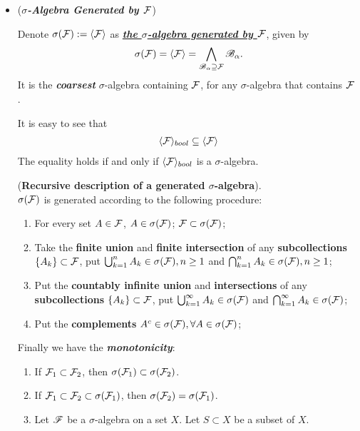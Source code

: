 \documentclass[11pt]{article}
\begin{document}
\begin{itemize}
\item  \begin{example} (\emph{\textbf{$\sigma$-Algebra Generated by ${\mathcal F}$}})
\begin{definition}
Denote $\sigma({\mathcal F}) := \langle {\mathcal F} \rangle$ as  \underline{\emph{\textbf{the $\sigma$-algebra generated by ${\mathcal F}$}}}, given by 
\begin{align*}
\sigma({\mathcal F}) = \langle {\mathcal F} \rangle = \bigwedge_{{\mathscr B}_{\alpha} \supseteq {\mathcal F}}{\mathscr B}_{\alpha}.
\end{align*}
 It is the  \emph{\textbf{coarsest}} $\sigma$-algebra containing ${\mathcal F}$, for any $\sigma$-algebra that contains ${\mathcal F}$  . 
\end{definition}

It is easy to see that 
\begin{align*}
\langle {\mathcal F} \rangle_{bool} \subseteq \langle {\mathcal F} \rangle 
\end{align*} The equality holds if and only if $\langle {\mathcal F} \rangle_{bool}$ is a $\sigma$-algebra. 

\begin{proposition} (\textbf{Recursive description of a generated  $\sigma$-algebra}). \citep{tao2011introduction} \\
$\sigma({\mathcal F})$ is generated according to the following procedure: 
\begin{enumerate}
\item For every set $A \in {\mathcal F}$, $A\in \sigma({\mathcal F})$; ${\mathcal F} \subset \sigma({\mathcal F})$;
\item Take the \textbf{finite union} and \textbf{finite intersection} of any \textbf{subcollections} $\left\{A_{k}\right\}\subset {\mathcal F}$, put $\bigcup_{k=1}^{n}A_{k} \in \sigma({\mathcal F}), n\ge 1$ and  $\bigcap_{k=1}^{n}A_{k} \in \sigma({\mathcal F}), n\ge 1$;
\item Put the \textbf{countably infinite union} and \textbf{intersections} of any \textbf{subcollections} $\left\{A_{k}\right\}\subset {\mathcal F}$, put $\bigcup_{k=1}^{\infty}A_{k} \in \sigma({\mathcal F})$ and  $\bigcap_{k=1}^{\infty}A_{k} \in \sigma({\mathcal F})$;
\item Put the \textbf{complements} $A^{c} \in \sigma({\mathcal F}), \forall A\in \sigma({\mathcal F})$;
\end{enumerate}
\end{proposition}

Finally we have the \emph{\textbf{monotonicity}}: 
\begin{enumerate}
\item \begin{proposition}
 If ${\mathcal F}_{1} \subset {\mathcal F}_{2}$, then $\sigma({\mathcal F}_{1}) \subset \sigma({\mathcal F}_{2})$. 
 \end{proposition}
\item \begin{proposition}
  If ${\mathcal F}_{1}  \subset {\mathcal F}_{2} \subset \sigma({\mathcal F}_{1})$, then $\sigma({\mathcal F}_{2}) = \sigma({\mathcal F}_{1})$.
 \end{proposition}
\item \begin{proposition}
Let ${\mathscr F}$ be a $\sigma$-algebra on a set $X$. Let $S \subset X$ be a subset of $X$.


\end{proposition}
\end{enumerate}
\end{example}
\end{itemize}
\end{document}
